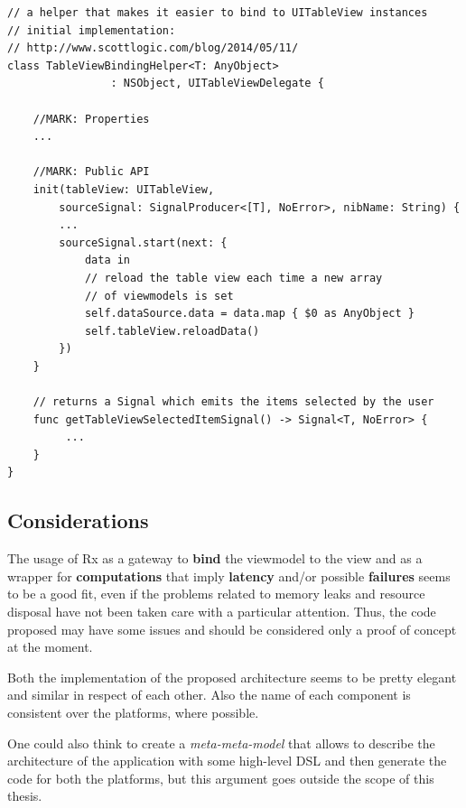 \begin{verbatim}
// a helper that makes it easier to bind to UITableView instances
// initial implementation: 
// http://www.scottlogic.com/blog/2014/05/11/
class TableViewBindingHelper<T: AnyObject> 
				: NSObject, UITableViewDelegate {

    //MARK: Properties
    ...

    //MARK: Public API
    init(tableView: UITableView,
        sourceSignal: SignalProducer<[T], NoError>, nibName: String) {
        ...
        sourceSignal.start(next: {
            data in
            // reload the table view each time a new array 
            // of viewmodels is set
            self.dataSource.data = data.map { $0 as AnyObject }
            self.tableView.reloadData()
        })
    }

    // returns a Signal which emits the items selected by the user
    func getTableViewSelectedItemSignal() -> Signal<T, NoError> {
         ...
    }
}
\end{verbatim}


\subsection{Considerations}\label{considerations}

The usage of Rx as a gateway to \textbf{bind} the viewmodel to the view
and as a wrapper for \textbf{computations} that imply \textbf{latency}
and/or possible \textbf{failures} seems to be a good fit, even if the
problems related to memory leaks and resource disposal have not been
taken care with a particular attention. Thus, the code proposed may have
some issues and should be considered only a proof of concept at the
moment.

Both the implementation of the proposed architecture seems to be pretty
elegant and similar in respect of each other. Also the name of each
component is consistent over the platforms, where possible.

One could also think to create a \emph{meta-meta-model} that allows to
describe the architecture of the application with some high-level DSL
and then generate the code for both the platforms, but this argument
goes outside the scope of this thesis.
